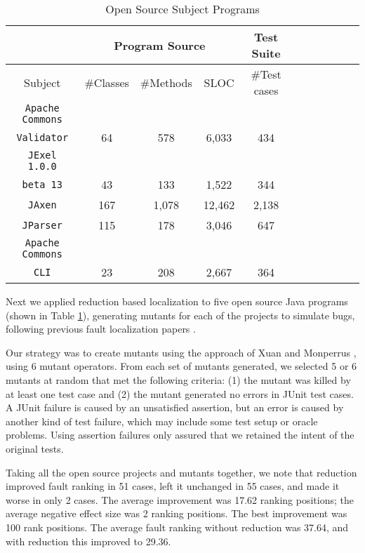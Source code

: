 


\begin{table}
{\scriptsize
\begin{center}
\begin{tabular}{|c||c|c|c|c|c||c|c|c|c|c|}
\hline
\hline
& \multicolumn{3}{|c|}{Program Source} & \multicolumn{1}{|c|}{Test Suite} \\
\hline
Subject & \#Classes & \#Methods & SLOC & \#Test cases \\
\hline
\hline
{\tt Apache Commons} & & & & \\
{\tt Validator} & 64 & 578 & 6,033 & 434 \\
\hline
{\tt JExel 1.0.0} & & & & \\
{\tt beta 13} & 43 & 133 & 1,522	 & 344  \\
\hline
{\tt JAxen} & 167 & 1,078 & 12,462 & 2,138\\
\hline
{\tt JParser} & 115 & 178 & 3,046 & 647 \\
\hline
{\tt Apache Commons} & & & & \\
{\tt CLI} & 23 & 208 & 2,667 & 364 \\ 
\hline
\hline
\end{tabular}
\end{center}
}
\caption{Open Source Subject Programs}
\label{tab:opensourcesubs}
\end{table}



Next we applied reduction based localization to five open source Java
programs (shown in Table \ref{tab:opensourcesubs}), generating mutants
for each of the projects to simulate bugs, following previous fault
localization papers \cite{mutant,PureTest}.





 
Our strategy was to create mutants using the approach of Xuan and
Monperrus \cite{PureTest}, using 6 mutant operators.  From each set of
mutants generated, we selected 5 or 6 mutants at random that met the
following criteria: (1) the mutant was killed by at least one test
case and (2) the mutant generated no errors in JUnit test cases.  A
JUnit failure is caused by an unsatisfied assertion, but an error is
caused by another kind of test failure, which may include some test
setup or oracle problems.  Using assertion failures only assured that
we retained the intent of the original tests.

Taking all the open source projects and mutants together, we note that
reduction improved fault ranking in 51 cases, left it unchanged in 55
cases, and made it worse in only 2 cases.  The average improvement was
17.62 ranking positions; the average negative effect size was 2
ranking positions.  The best improvement was 100 rank positions.  The
average fault ranking without reduction was 37.64, and with reduction
this improved to 29.36.
